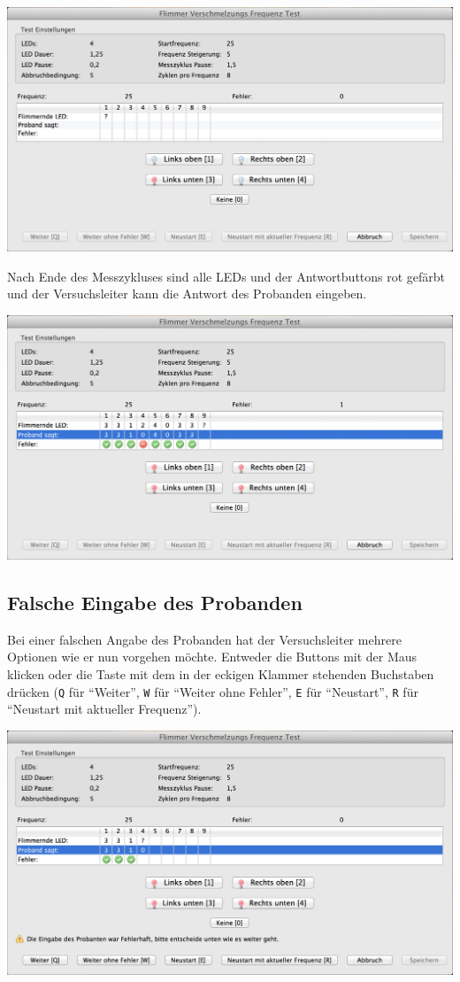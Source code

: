 \documentclass[11pt,accentcolor=tud2a,colorback,noheadingspace,bigchapter]{tudreport}
\begin{document}
\includegraphics[width=\textwidth]{testrunner_running.png}

Nach Ende des Messzykluses sind alle LEDs und der Antwortbuttons rot gefärbt und der Versuchsleiter kann die Antwort des Probanden eingeben.

\includegraphics[width=\textwidth]{testrunner_waiting.png}


\subsection{Falsche Eingabe des Probanden}
\label{tests:falsche-eingabe-des-probanden}
Bei einer falschen Angabe des Probanden hat der Versuchsleiter mehrere Optionen wie er nun vorgehen möchte. Entweder die Buttons mit der Maus klicken oder die Taste mit dem in der eckigen Klammer stehenden Buchstaben drücken (\texttt{Q} für ``Weiter'', \texttt{W} für ``Weiter ohne Fehler'', \texttt{E} für ``Neustart'', \texttt{R} für ``Neustart mit aktueller Frequenz'').

\includegraphics[width=\textwidth]{testrunner_wronganswer.png}
\end{document}
